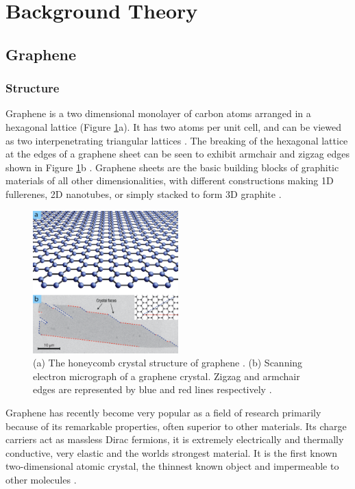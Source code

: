 \documentclass[12pt,titlepage]{article}
\begin{document}
	\newpage
	\section{Background Theory}
	\subsection{Graphene}
	\subsubsection{Structure}
	Graphene is a two dimensional monolayer of carbon atoms arranged in a hexagonal lattice (Figure \ref{fig:graphene}a). It has two atoms per unit cell, and can be viewed as two interpenetrating triangular lattices \cite{Novoselov2011}. The breaking of the hexagonal lattice at the edges of a graphene sheet can be seen to exhibit armchair and zigzag edges shown in Figure \ref{fig:graphene}b \cite{Geim2007}. Graphene sheets are the basic building blocks of graphitic materials of all other dimensionalities, with different constructions making 1D fullerenes, 2D nanotubes, or simply stacked to form 3D graphite \cite{Geim2007}.
	
	\begin{figure}
		\centering
		\includegraphics[width=0.5\textwidth]{figures/graphene.png}
		\caption[The crystal structure of graphene.]{(a) The honeycomb crystal structure of graphene \cite{Novoselov2011}. (b) Scanning electron micrograph of a graphene crystal. Zigzag and armchair edges are represented by blue and red lines respectively \cite{Geim2007}.}
		\label{fig:graphene}
	\end{figure}
	
	Graphene has recently become very popular as a field of research primarily because of its remarkable properties, often superior to other materials. Its charge carriers act as massless Dirac fermions, it is extremely electrically and thermally conductive, very elastic and the worlds strongest material. It is the first known two-dimensional atomic crystal, the thinnest known object and impermeable to other molecules \cite{Novoselov2011}.
	
\end{document}
